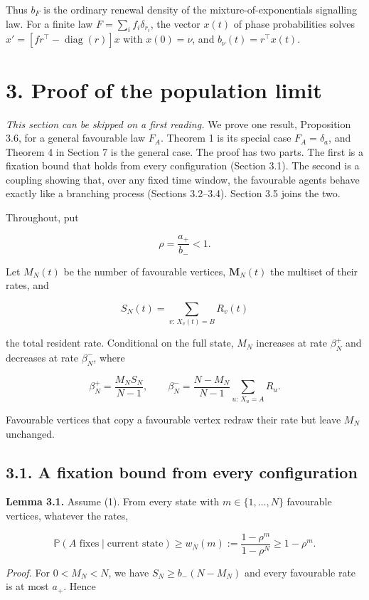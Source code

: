 \documentclass[
  british,
  11pt,
  a4paper,
]{article}
\begin{document}
Thus \(b_F\) is the ordinary renewal density of the
mixture-of-exponentials signalling law. For a finite law
\(F=\sum_i f_i\delta_{r_i}\), the vector \(x(t)\) of phase probabilities
solves \(x'=[f r^\top-\operatorname{diag}(r)]x\) with \(x(0)=\nu\), and
\(b_\nu(t)=r^\top x(t)\).

\section{3. Proof of the population
limit}\label{proof-of-the-population-limit}

\emph{This section can be skipped on a first reading.} We prove one
result, Proposition 3.6, for a general favourable law \(F_A\). Theorem 1
is its special case \(F_A=\delta_a\), and Theorem 4 in Section 7 is the
general case. The proof has two parts. The first is a fixation bound
that holds from every configuration (Section 3.1). The second is a
coupling showing that, over any fixed time window, the favourable agents
behave exactly like a branching process (Sections 3.2--3.4). Section 3.5
joins the two.

Throughout, put

\[
\rho=\frac{a_+}{b_-}<1.
\tag{10}
\]

Let \(M_N(t)\) be the number of favourable vertices, \(\mathbf M_N(t)\)
the multiset of their rates, and

\[
S_N(t)=\sum_{v:\,X_v(t)=B}R_v(t)
\]

the total resident rate. Conditional on the full state, \(M_N\)
increases at rate \(\beta_N^+\) and decreases at rate \(\beta_N^-\),
where

\[
\beta_N^+=\frac{M_NS_N}{N-1},\qquad
\beta_N^-=\frac{N-M_N}{N-1}\sum_{u:\,X_u=A}R_u.
\tag{11}
\]

Favourable vertices that copy a favourable vertex redraw their rate but
leave \(M_N\) unchanged.

\subsection{3.1. A fixation bound from every
configuration}\label{a-fixation-bound-from-every-configuration}

\textbf{Lemma 3.1.} Assume (1). From every state with
\(m\in\{1,\ldots,N\}\) favourable vertices, whatever the rates,

\[
\mathbb P(A\text{ fixes}\mid\text{current state})\ge w_N(m):=\frac{1-\rho^m}{1-\rho^N}\ge1-\rho^m.
\tag{12}
\]

\emph{Proof.} For \(0<M_N<N\), we have \(S_N\ge b_-(N-M_N)\) and every
favourable rate is at most \(a_+\). Hence
\end{document}
